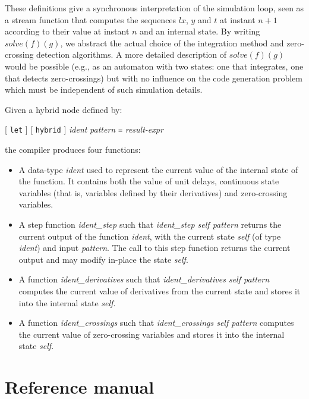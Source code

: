 \documentclass[11pt,titlepage,twoside]{report}
\newcommand{\lx}{\ensuremath{\mathit{lx}}}
\newcommand{\Solve}[2]{\mathit{solve}({#1})({#2})}
\newcommand{\term}[1]{{\tt #1}}
\newcommand{\nterm}[1]{{\em #1}}
\begin{document}
These definitions give a synchronous interpretation of the simulation loop,
seen as a stream function that computes the sequences $\lx$, $y$ and $t$
at instant $n+1$ according to their value at instant $n$ and an
internal state. By writing $\Solve{f}{g}$, we abstract the
actual choice of the integration method and zero-crossing detection
algorithms. A more detailed description of $\Solve{f}{g}$ would be
possible (e.g., as an automaton with two states: one that integrates, one 
that detects zero-crossings) but with no influence on
the code generation problem which must be independent of such simulation
details. 


Given a hybrid node defined by:
\begin{center}
  [ \term{let} ] [ \term{hybrid} ] \nterm{ident} \nterm{pattern} \term{=}
  \nterm{result-expr}
\end{center}
the compiler produces four functions:

\begin{itemize}
\item
  A data-type \nterm{ident} used to represent the current
  value of the internal state of the function. It contains both the
  value of unit delays, continuous state variables (that is, variables
  defined by their derivatives) and zero-crossing variables.
\item
  A step function \nterm{ident\_step} such that
    \nterm{ident\_step self pattern} returns the current output of the function
    \nterm{ident}, with the current state \nterm{self} (of type
    \nterm{ident}) and input \nterm{pattern}. The call to this step
    function returns the current output and may modify in-place
    the state \nterm{self}.
  \item
    A function \nterm{ident\_derivatives} such that
    \nterm{ident\_derivatives self pattern} computes the
    current value of derivatives from the current state and stores it
    into the internal state \nterm{self}.
  \item
    A function \nterm{ident\_crossings} such that
    \nterm{ident\_crossings self pattern} computes the
    current value of zero-crossing variables and stores it into the
    internal state \nterm{self}. 
\end{itemize}


\cleardoublepage

\part{Reference manual}
\label{reference-manual}
\cleardoublepage
\end{document}
